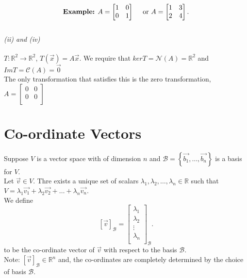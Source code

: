 \documentclass{report}
\begin{document}
{       \[
       \text{\textbf{Example:} } A = \begin{bmatrix}
       1 & 0\\
       0 & 1\\
       \end{bmatrix} \quad \text{ or } A =  \begin{bmatrix}
       1 & 3\\
       2 & 4\\
       \end{bmatrix}
       .\] 
       \\
       \textit{ (ii) and (iv) }\\
       \\
       $ T: \mathbb{R} ^2 \to \mathbb{R} ^2$, $ T \left(  \vec{ x}  \right) = A \vec{ x} $. We require that $ ker T =  \mathcal{N} \left( A \right) = \mathbb{R} ^2 $ and $ Im T = \mathcal{C} \left( A \right) = { \vec{ 0} }$\\
       The only transformation that satisfies this is the zero transformation, $ A = \begin{bmatrix}
       0 & 0\\
       0& 0\\
       \end{bmatrix}$
       \section{Co-ordinate Vectors }
       Suppose $ V$ is a vector space with of dimension $ n$ and $ \mathcal{B} = \left\{ \vec{ b_1} ,\ldots , \vec{ b_n}  \right\} $ is a basis for $ V$.\\
       Let $ \vec{ v} \in V$. Thre exists a unique set of scalars $ \lambda_1, \lambda_2, \ldots , \lambda_n \in \mathbb{R}$ such that $ V = \lambda_1 \vec{ v_1} + \lambda_2 \vec{ v_2} + \ldots + \lambda _n \vec{ v_n} $.\\
       We define \[
        \left[ \vec{ v}  \right]_{ \mathcal{B}}  = \begin{bmatrix}
        \lambda_1\\
        \lambda_2\\
        \vdots\\
        \lambda_n\\
        \end{bmatrix} _{ \mathcal{B}} 
       .\] 
       to be the co-ordinate vector of $ \vec{ v} $ with respect to the basis $ \mathcal{B}$.\\
       Note: $ \left[ \vec{ v}  \right]_{ \mathcal{B}} \in \mathbb{R} ^{n}$ and, the co-ordinates are completely determined by the choice of basis $ \mathcal{B}$.\\
   
}
\end{document}
